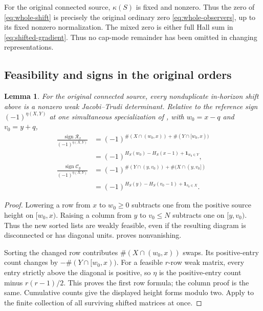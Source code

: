 \documentclass[11pt,a4paper]{amsart}
\numberwithin{equation}{section}
\theoremstyle{plain}
\newtheorem{lemma}[theorem]{Lemma}
\theoremstyle{definition}
\newcommand{\one}{\mathbf1}
\begin{document}
For the original connected source, \(\kappa(S)\) is fixed and nonzero.
Thus the zero of \eqref{eq:whole-shift} is precisely the original ordinary
zero \eqref{eq:whole-observers}, up to its fixed nonzero normalization.
The mixed zero is either full Hall sum in \eqref{eq:shifted-gradient}.
Thus no cap-mode remainder has been omitted in changing representations.

\subsection{Feasibility and signs in the original orders}

\begin{lemma}\label{lem:shift-sign}
For the original connected source, every nonduplicate in-horizon shift
above is a nonzero weak Jacobi--Trudi determinant.  Relative to the
reference sign \((-1)^{\eta(X,Y)}\) at one
simultaneous specialization of , with \(w_0=x-q\)
and \(v_0=y+q\),
\begin{equation}\label{eq:shift-sign}
 \begin{aligned}
 \frac{\operatorname{sign}\mathcal R_x}{(-1)^{\eta(X,Y)}}
 &=(-1)^{\#(X\cap(w_0,x))+\#(Y\cap[w_0,x))}\\
 &=(-1)^{H_S(w_0)-H_S(x-1)+\one_{w_0\in Y}},\\
 \frac{\operatorname{sign}\mathcal C_y}{(-1)^{\eta(X,Y)}}
 &=(-1)^{\#(Y\cap(y,v_0))+\#(X\cap(y,v_0])}\\
 &=(-1)^{H_S(y)-H_S(v_0-1)+\one_{v_0\in X}}.
 \end{aligned}
\end{equation}
\end{lemma}
\begin{proof}
Lowering a row from \(x\) to \(w_0\ge0\) subtracts one from the positive
source height on \([w_0,x)\).  Raising a column from \(y\) to \(v_0\le N\)
subtracts one on \([y,v_0)\).  Thus the new sorted lists are weakly feasible,
even if the resulting diagram is disconnected or has diagonal units.
 proves nonvanishing.

Sorting the changed row contributes \(\#(X\cap(w_0,x))\) swaps.  Its
positive-entry count changes by \(-\#(Y\cap[w_0,x))\).  For a feasible
\(r\)-row weak matrix, every entry strictly above the diagonal is positive,
so \(\eta\) is the positive-entry count minus \(r(r-1)/2\).  This proves the
first row formula; the column proof is the same.  Cumulative counts give
the displayed height forms modulo two.  Apply  to the
finite collection of all surviving shifted matrices at once.
\end{proof}
\end{document}
